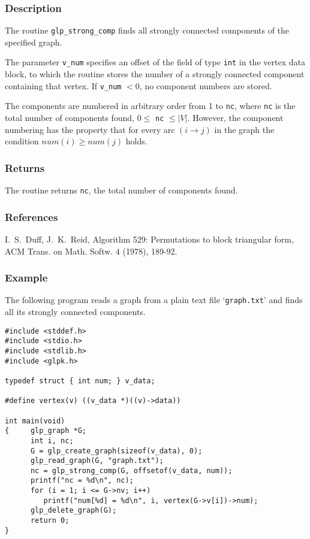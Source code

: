 \documentclass[dvipdfm,11pt]{report}
\begin{document}
\subsubsection*{Description}

The routine \verb|glp_strong_comp| finds all strongly connected
components of the specified graph.

The parameter \verb|v_num| specifies an offset of the field of type
\verb|int| in the vertex data block, to which the routine stores the
number of a strongly connected component containing that vertex. If
\verb|v_num| $<0$, no component numbers are stored.

The components are numbered in arbitrary order from 1 to \verb|nc|,
where \verb|nc| is the total number of components found,
$0\leq$ \verb|nc| $\leq|V|$. However, the component numbering has the
property that for every arc $(i\rightarrow j)$ in the graph the
condition $num(i)\geq num(j)$ holds.

\subsubsection*{Returns}

The routine returns \verb|nc|, the total number of components found.

\subsubsection*{References}

I.~S.~Duff, J.~K.~Reid, Algorithm 529: Permutations to block triangular
form, ACM Trans. on Math. Softw. 4 (1978), 189-92.

\subsubsection*{Example}

The following program reads a graph from a plain text file
`\verb|graph.txt|' and finds all its strongly connected components.

\begin{footnotesize}
\begin{verbatim}
#include <stddef.h>
#include <stdio.h>
#include <stdlib.h>
#include <glpk.h>

typedef struct { int num; } v_data;

#define vertex(v) ((v_data *)((v)->data))

int main(void)
{     glp_graph *G;
      int i, nc;
      G = glp_create_graph(sizeof(v_data), 0);
      glp_read_graph(G, "graph.txt");
      nc = glp_strong_comp(G, offsetof(v_data, num));
      printf("nc = %d\n", nc);
      for (i = 1; i <= G->nv; i++)
         printf("num[%d] = %d\n", i, vertex(G->v[i])->num);
      glp_delete_graph(G);
      return 0;
}
\end{verbatim}
\end{footnotesize}
\end{document}
